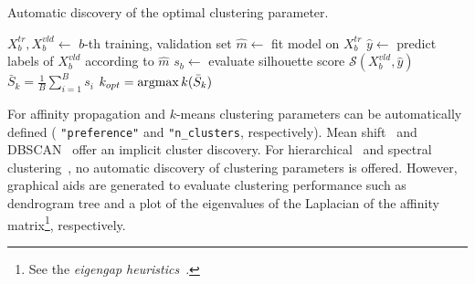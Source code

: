 \begin{algorithm}[]
  \caption{Automatic discovery of the optimal clustering parameter.}\label{alg:clusters}
    \begin{algorithmic}[1]
              \State $X^{tr}_b,X^{vld}_b\leftarrow$ $b$-th training, validation set
              \State $\hat{m}\leftarrow$ fit model on $X^{tr}_b$
              \State $\hat{y}\leftarrow$ predict labels of $X^{vld}_b$ according to $\hat{m}$
              \State $s_b\leftarrow$ evaluate silhouette score  $\mathcal{S}(X^{vld}_b,\hat{y})$
        \EndFor
        \State $\bar{S}_k = \frac{1}{B}\sum_{i=1}^B s_i$
        \EndFor
        \State $k_{opt} = \mathop{\mathrm{argmax}}\limits{k}(\bar{S}_k)$
    \end{algorithmic}
\end{algorithm}

For affinity propagation \cite{frey2007clustering} and $k$-means \cite{bishop2006pattern} clustering parameters can be automatically defined ({\color{string} {\tt "preference"}}  and {\color{string} {\tt "n\_clusters}}, respectively).
Mean shift~\cite{comaniciu2002mean} and DBSCAN~\cite{ester1996density} offer an implicit cluster discovery.
For hierarchical~\cite{hastie2009elements} and spectral clustering~\cite{shi2000normalized}, no automatic discovery of clustering parameters is offered. However, graphical aids are generated to evaluate clustering performance such as dendrogram tree and a plot of the eigenvalues of the Laplacian of the affinity matrix\footnote{ See the \textit{eigengap heuristics}~\cite{von2007tutorial}.}, respectively.


